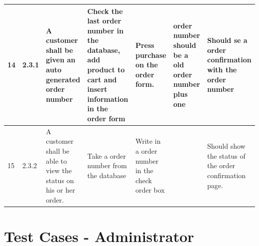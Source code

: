 \documentclass[a4paper,12pt]{article}
\begin{document}
{\begin{tabular}{ |p{0.8cm}|p{0.8cm}|p{2.8cm}|p{2.8cm}|p{2.8cm}|p{2.8cm}|p{2.8cm}|}
	\hline
	14 &2.3.1 &A customer shall be given an auto generated order number& Check the last order number in the database, add product to cart and insert information in the order form & Press purchase on the order form. & order number should be a old order number plus one  & Should se a order confirmation with the order number \\	\hline
	15 &2.3.2 &A customer shall be able to view the status on his or her order.& Take a order number from the database & Write in a order number in the check order box & & Should show the status of the order confirmation page. \\ \hline	
\end{tabular}
}
	\newpage
	\section{Test Cases - Administrator}
\end{document}
